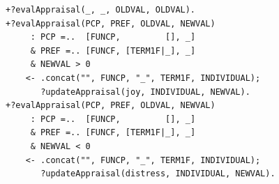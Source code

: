 \begin{figure}
\begin{center}
    \begin{minipage}{130mm}
	\lstset{linewidth=130mm}
	\begin{lstlisting}[frame=trbl,
caption=Amostra de código referente à atualização das emoções.,
label=lst:acEmotion]
+?evalAppraisal(_, _, OLDVAL, OLDVAL).
+?evalAppraisal(PCP, PREF, OLDVAL, NEWVAL)
     : PCP =..  [FUNCP,         [], _]
     & PREF =.. [FUNCF, [TERM1F|_], _]
     & NEWVAL > 0
    <- .concat("", FUNCP, "_", TERM1F, INDIVIDUAL);
       ?updateAppraisal(joy, INDIVIDUAL, NEWVAL).
+?evalAppraisal(PCP, PREF, OLDVAL, NEWVAL)
     : PCP =..  [FUNCP,         [], _]
     & PREF =.. [FUNCF, [TERM1F|_], _]
     & NEWVAL < 0
    <- .concat("", FUNCP, "_", TERM1F, INDIVIDUAL);
       ?updateAppraisal(distress, INDIVIDUAL, NEWVAL).
	\end{lstlisting}
    \end{minipage}
\end{center}
\end{figure}

